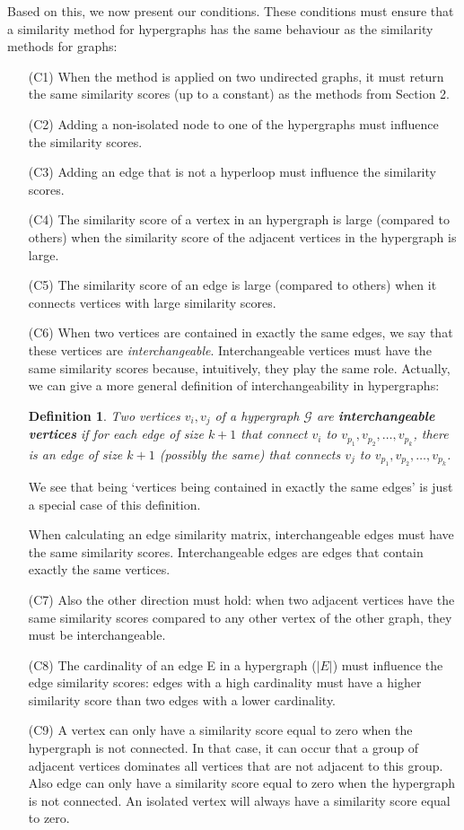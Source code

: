 \documentclass[a4paper,11pt]{report}
\newtheorem{definition}[theorem]{Definition}
\newcommand{\hgraf}{\mathcal{G}}
\begin{document}
Based on this, we now present our conditions. These conditions must ensure that 
a similarity method for hypergraphs has the same behaviour as the similarity 
methods for graphs:
\begin{itemize}
  \item[(C1)] When the method is applied on two undirected graphs, it must return the same 
  similarity scores (up to a constant) as the methods from Section 2.
  \item[(C2)] Adding a non-isolated node to one of the hypergraphs must influence 
  the similarity scores.
  \item[(C3)] Adding an edge that is not a hyperloop 
  must influence the similarity scores.
  \item[(C4)] The similarity score of a vertex in an hypergraph is large (compared to others) when the similarity score 
  of the adjacent vertices in the hypergraph is large.
  \item[(C5)] The similarity score of an edge is large (compared to others) when it connects vertices 
  with large similarity scores.
  \item[(C6)] When two vertices are contained in exactly the same edges, we say 
  that these vertices are \emph{interchangeable}. Interchangeable vertices must have 
  the same similarity scores because, intuitively, they play the same role. 
  Actually, we can give a more general definition of interchangeability in 
  hypergraphs:
  \begin{definition}
    Two vertices $v_i, v_j$ of a hypergraph $\hgraf$ are \textbf{interchangeable 
    vertices}
  if for each edge of size $k+1$ that connect $v_i$ to $v_p_1, v_p_2,\ldots, v_p_k$, there is an edge of size $k+1$ (possibly the same) that connects
  $v_j$ to $v_p_1, v_p_2,\ldots, v_p_k$. 
  \end{definition}
  We see that being `vertices being contained in exactly the same edges' is just 
  a special case of this definition.
  
 When calculating 
  an edge similarity matrix, interchangeable edges must have the same similarity 
  scores. Interchangeable edges are edges that contain exactly the same 
  vertices.
  \item[(C7)] Also the other direction must hold: when two adjacent vertices have the same similarity scores compared
  to any other vertex of the other graph, they must 
  be interchangeable. 
  \item[(C8)] The cardinality of an edge E in a hypergraph ($|E|$) must 
  influence the edge similarity scores: edges with a high cardinality must have a higher similarity score than two edges with a lower cardinality.
      \item[(C9)] A vertex can only have a similarity score equal to zero when the hypergraph is not connected. In that case, it can occur that a group
  of adjacent vertices dominates all vertices that are not adjacent to this group. 
  Also edge can only have a similarity score equal to zero when the hypergraph is not connected. 
  An isolated vertex will always have a similarity score equal 
  to zero.   \end{itemize}  
 
\end{document}
